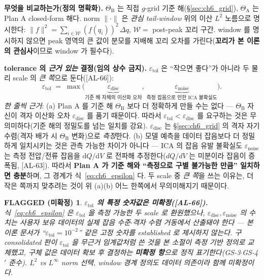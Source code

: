 \documentclass[11pt,a4paper]{article}
\newtheorem*{flagbox}{FLAGGED (미확정)}
\newcommand{\dd}{\mathrm{d}}
\newcommand{\tol}{\mathrm{tol}}
\newcommand{\noise}{\mathrm{noise}}
\newcommand{\AL}[1]{\textsf{[AL-#1]}}
\begin{document}
\textbf{무엇을 비교하는가(정의 명확화).} $\Theta_{\mathrm B}$ 는 직접 $g$-grid 기준 해(\S\ref{sec:ch6_grid}),
$\Theta_{\mathrm A}$ 는 Plan A closed-form 해다. norm $\lVert\cdot\rVert$ 은 \emph{관심 tail-window} 위의 이산
$L^2$ 노름으로 명시한다: $\lVert f\rVert^2=\sum_{i\in\mathcal W}(f(q_i))^2\,\Delta q$, $\mathcal W=$ post-peak 꼬리
구간. window 를 명시하지 않으면 peak 영역의 큰 값이 분모를 지배해 꼬리 오차를 가린다(\textbf{꼬리가 본 이론의
관심사}이므로 window 가 필수다).

\textbf{tolerance 의 \emph{근거 있는} 결정(임의 상수 금지).} $\varepsilon_\tol$ 은 ``작으면 좋다''가 아니라 두 물리
scale 의 \emph{큰 쪽}으로 둔다(\AL{66}):
\begin{equation}
\varepsilon_\tol\;=\;\max\!\Big(\underbrace{\varepsilon_{\mathrm{disc}}}_{\text{기준 해 자체의 이산화 오차}},\
\underbrace{\varepsilon_\noise}_{\text{측정 잡음으로 인한 ICA 불확실도}}\Big).
\label{eq:ch6_epsilon}
\end{equation}
\emph{한 줄씩 근거}: (a) Plan A 를 기준 해 $\Theta_{\mathrm B}$ 보다 더 정확하게 만들 수는 없다 — $\Theta_{\mathrm B}$
자신이 격자 이산화 오차 $\varepsilon_{\mathrm{disc}}$ 를 품기 때문이다. 따라서 $\varepsilon_\tol<\varepsilon_{\mathrm{disc}}$
를 요구하는 것은 무의미하다(기준 해의 정밀도를 넘는 일치를 강요). $\varepsilon_{\mathrm{disc}}$ 는 \S\ref{sec:ch6_grid}
의 격자 자기수렴(격자 배가 시 $\Theta_{\mathrm B}$ 변화)으로 \emph{측정}한다. (b) 모델 예측을 데이터 잡음보다 더
정밀하게 일치시키는 것은 관측 가능한 차이가 아니다 — ICA 의 잡음 유발 불확실도 $\varepsilon_\noise$ 는 측정
전압/전류 잡음을 $\dd Q/\dd V$ 로 전파해 추정한다($dQ/dV$ 는 미분이라 잡음이 증폭됨, \cite{dubarry2022,fly2020}
\AL{63}). 따라서 \textbf{Plan A 가 기준 해와 ``측정으로 구별 불가능한 만큼'' 일치하면 충분}하며, 그 경계가
식~\eqref{eq:ch6_epsilon} 다. 두 scale 중 \emph{큰 쪽}을 쓰는 이유는, 더 작은 쪽까지 맞추려는 것이 위 (a)(b)
어느 한쪽에서 무의미해지기 때문이다.
\begin{flagbox}
\textbf{$\varepsilon_\tol$ 의 \emph{특정 숫자값}은 미확정(\AL{66}).} 식~\eqref{eq:ch6_epsilon} 은 $\varepsilon_\tol$
을 \emph{측정 가능한 두 scale} 로 환원했으나, $\varepsilon_{\mathrm{disc}},\varepsilon_\noise$ 의 \emph{수치}는
사용자 보유 데이터의 실제 잡음 수준$\cdot$격자 수렴 거동에서 산출돼야 한다 — 본 이론 문서가 ``$\varepsilon_\tol=10^{-2}$''
같은 \emph{고정 숫자}를 established 로 제시하지 않는다. 구 consolidated 판이 $\varepsilon_\tol$ 을 무근거 임계값처럼
쓴 것을 본 소절이 \emph{측정 기반 정의}로 교체했고, 구체 값은 데이터 확보 후 결정하는 \textbf{미확정 항}으로 정직
표기한다(GS-3$\cdot$GS-4$'$ 준수). $L^2$ vs $L^\infty$ norm 선택, window 경계 정의도 데이터 의존이라 함께 미확정이다.
\end{flagbox}
\end{document}
